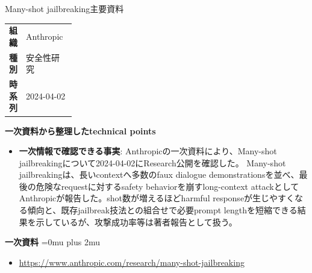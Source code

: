 \Needspace{0.38\textheight}
\begin{technicalnote}{Many-shot jailbreaking}{主要資料}
\begingroup
\begin{tabularx}{\linewidth}{@{}>{\bfseries}p{0.22\linewidth}X@{}}
組織 & Anthropic \\
種別 & 安全性研究 \\
時系列 & 2024-04-02 \\
\end{tabularx}
\smallskip
\begin{minipage}{\linewidth}
{\bfseries 一次資料から整理したtechnical points}
\begin{itemize}[leftmargin=1.5em,itemsep=0.35em]
\item \textbf{一次情報で確認できる事実}: Anthropicの一次資料により、Many-shot jailbreakingについて2024-04-02にResearch公開を確認した。 Many-shot jailbreakingは、長いcontextへ多数のfaux dialogue demonstrationsを並べ、最後の危険なrequestに対するsafety behaviorを崩すlong-context attackとしてAnthropicが報告した。shot数が増えるほどharmful responseが生じやすくなる傾向と、既存jailbreak技法との組合せで必要prompt lengthを短縮できる結果を示しているが、攻撃成功率等は著者報告として扱う。
\end{itemize}
\begin{minipage}{\linewidth}
\begin{samepage}
{\bfseries 一次資料}
\begingroup\sloppy
\Urlmuskip=0mu plus 2mu\relax
\begin{itemize}[leftmargin=1.5em,itemsep=0.25em]
\item {\scriptsize\url{https://www.anthropic.com/research/many-shot-jailbreaking}}
\end{itemize}
\endgroup
\end{samepage}
\end{minipage}
\end{minipage}
\endgroup
\end{technicalnote}
\medskip

